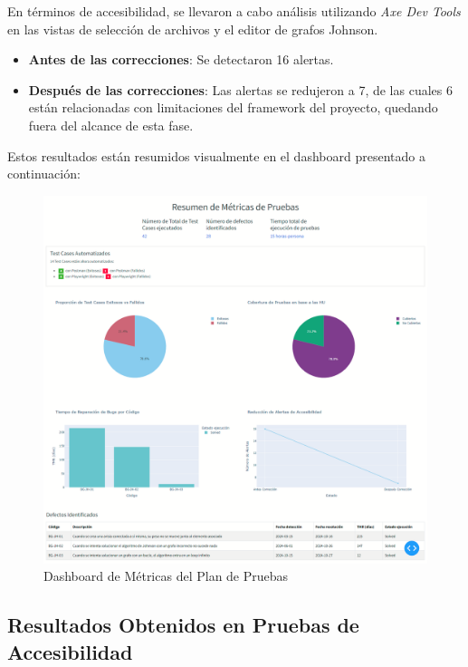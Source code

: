 \documentclass[stu, 12pt, letterpaper, donotrepeattitle, floatsintext, natbib]{apa7}
\begin{document}
\noindent En términos de accesibilidad, se llevaron a cabo análisis utilizando \textit{Axe Dev Tools} en las vistas de selección de archivos y el editor de grafos Johnson.  

\begin{itemize}
    \item \textbf{Antes de las correcciones}: Se detectaron 16 alertas.  
    \item \textbf{Después de las correcciones}: Las alertas se redujeron a 7, de las cuales 6 están relacionadas con limitaciones del framework del proyecto, quedando fuera del alcance de esta fase.  
\end{itemize}

\noindent Estos resultados están resumidos visualmente en el dashboard presentado a continuación:  

\begin{figure}[H]
    \label{fig:dashboard_metrica_pruebas}
    \centering
    \includegraphics[width=\textwidth]{../imgs/new_dashboard.png}
    \caption{Dashboard de Métricas del Plan de Pruebas}
\end{figure}

\subsection{Resultados Obtenidos en Pruebas de Accesibilidad}
\end{document}
